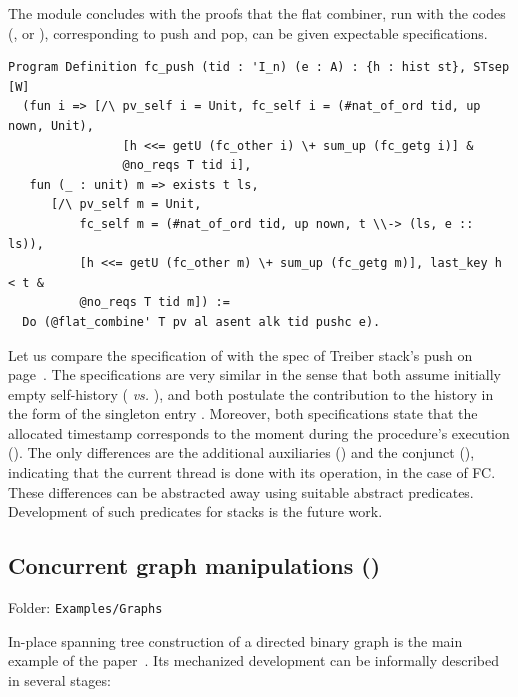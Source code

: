 The module concludes with the proofs that the flat combiner, run with
the codes (\ie,  or ), corresponding to push
and pop, can be given expectable specifications.

\begin{lstlisting}
Program Definition fc_push (tid : 'I_n) (e : A) : {h : hist st}, STsep [W] 
  (fun i => [/\ pv_self i = Unit, fc_self i = (#nat_of_ord tid, up nown, Unit),
                [h <<= getU (fc_other i) \+ sum_up (fc_getg i)] & 
                @no_reqs T tid i],
   fun (_ : unit) m => exists t ls, 
      [/\ pv_self m = Unit, 
          fc_self m = (#nat_of_ord tid, up nown, t \\-> (ls, e :: ls)),
          [h <<= getU (fc_other m) \+ sum_up (fc_getg m)], last_key h < t & 
          @no_reqs T tid m]) := 
  Do (@flat_combine' T pv al asent alk tid pushc e).  
\end{lstlisting}

Let us compare the specification of  with the spec of
Treiber stack's push on page~\pageref{lab:push}. The specifications
are very similar in the sense that both assume initially empty
self-history ( \emph{vs.} ), and both postulate the contribution to the
history in the form of the singleton entry . Moreover, both specifications state that the allocated
timestamp  corresponds to the moment during the procedure's
execution (). The only differences are the
additional auxiliaries () and the
conjunct (), indicating that the current thread
is done with its operation, in the case of FC. These differences can
be abstracted away using suitable abstract predicates. Development of
such predicates for stacks is the future work.

\subsection{Concurrent graph manipulations ()}
\label{sec:spanning-tree}

Folder: \texttt{Examples/Graphs}

In-place spanning tree construction of a directed binary graph is the
main example of the paper~\cite{Sergey-al:PLDI15}. Its mechanized
development can be informally described in several stages:

